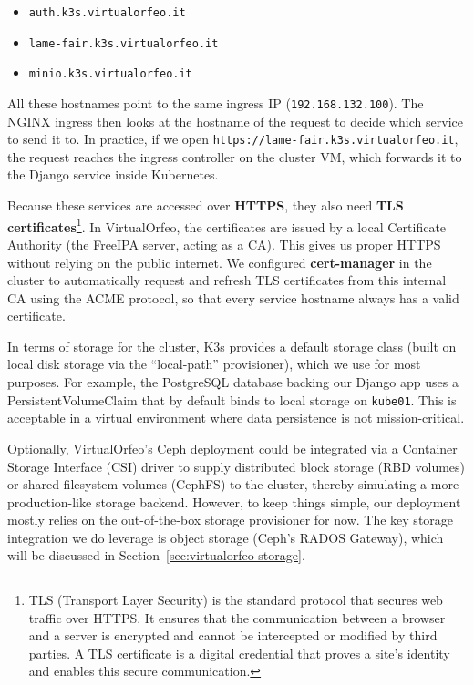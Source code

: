 \begin{itemize}
	\item \texttt{auth.k3s.virtualorfeo.it}
	\item \texttt{lame-fair.k3s.virtualorfeo.it}
	\item \texttt{minio.k3s.virtualorfeo.it}
\end{itemize}

All these hostnames point to the same ingress IP (\texttt{192.168.132.100}). The NGINX ingress then looks at the hostname of the request to decide which service to send it to. In practice, if we open \texttt{https://lame-fair.k3s.virtualorfeo.it}, the request reaches the ingress controller on the cluster VM, which forwards it to the Django service inside Kubernetes.

\medskip

Because these services are accessed over \textbf{HTTPS}, they also need
\textbf{TLS certificates}\footnote{TLS (Transport Layer Security) is the standard protocol that secures web traffic over HTTPS. It ensures that the communication between a browser and a server is encrypted and cannot be intercepted or modified by third parties. A TLS certificate is a digital credential that proves a site’s identity and enables this secure communication.}.
In VirtualOrfeo, the certificates are issued by a local Certificate Authority (the FreeIPA server, acting as a CA). This gives us proper HTTPS without relying on the public internet. We configured
\textbf{cert-manager} in the cluster to automatically request and refresh TLS
certificates from this internal CA using the ACME protocol, so that every service
hostname always has a valid certificate.

\medskip

In terms of storage for the cluster, K3s provides a default storage class (built
on local disk storage via the ``local-path'' provisioner), which we use for most
purposes. For example, the PostgreSQL database backing our Django app uses a
PersistentVolumeClaim that by default binds to local storage on
\texttt{kube01}. This is acceptable in a virtual environment where data
persistence is not mission-critical.

Optionally, VirtualOrfeo’s Ceph deployment could be integrated via a Container
Storage Interface (CSI) driver to supply distributed block storage (RBD volumes)
or shared filesystem volumes (CephFS) to the cluster, thereby simulating a more
production-like storage backend. However, to keep things simple, our deployment
mostly relies on the out-of-the-box storage provisioner for now. The key storage
integration we do leverage is object storage (Ceph’s RADOS Gateway), which will
be discussed in Section~\ref{sec:virtualorfeo-storage}.

